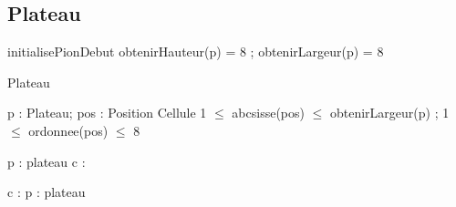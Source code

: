 \subsection{Plateau}

\begin{algorithme}
\end{algorithme}

\begin{algorithme}
  \signatureProcedureAvecPreconditions
    {initialisePionDebut}
    {}
    {obtenirHauteur(p) = 8 ; obtenirLargeur(p) = 8}
\end{algorithme}

\begin{algorithme}
    {Plateau}
    {}
\end{algorithme}

\begin{algorithme}
    {p : Plateau; pos : Position}
    {Cellule}
    {1 $\le$ abcsisse(pos) $\le$ obtenirLargeur(p) ; 1 $\le$ ordonnee(pos) $\le$ 8}
\end{algorithme}

\begin{algorithme}
\end{algorithme}

\begin{algorithme}
\end{algorithme}

\begin{algorithme}
\end{algorithme}

\begin{algorithme}
\end{algorithme}

\begin{algorithme}
    {p : plateau}
    {c : \chaine}
\end{algorithme}


\begin{algorithme}
    {c : \chaine}
    {p : plateau}
\end{algorithme}


